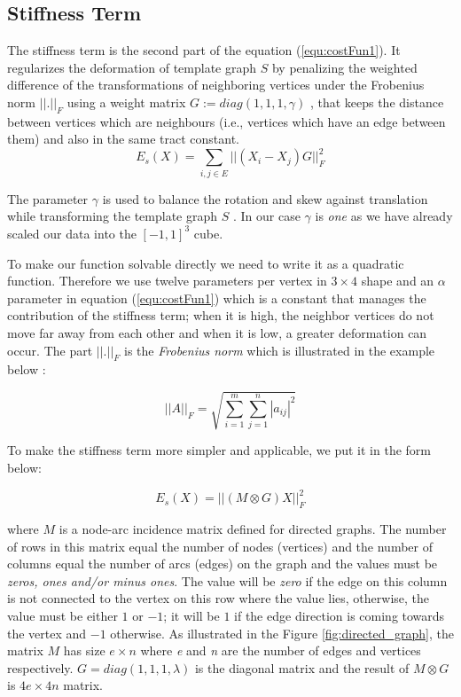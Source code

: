 \documentclass[../structure.tex]{subfiles}
\begin{document}
\subsection{Stiffness Term}
\hspace{2em}The stiffness term is the second part of the equation (\ref{equ:costFun1}). It regularizes the deformation of template graph $S$ by penalizing the weighted difference of the transformations of neighboring vertices under the Frobenius norm $||.||_{F}$ using a weight matrix $G := diag(1, 1, 1, \gamma)$ \cite{Amberg2007}, that keeps the distance between vertices which are neighbours (i.e., vertices which have an edge between them) and also in the same tract constant.
\begin{equation}
E_{s}(X) = \sum_{i,j \in E} ||(X_{i} - X_{j})G||_{F}^2
\label{equ:stiffness1}
\end{equation}

The parameter $\gamma$ is used to balance the rotation and skew against translation while transforming the template graph $S$ \cite{Amberg2007}. In our case $\gamma$ is \textit{one} as we have already scaled our data into the $[-1, 1]^3$ cube.

To make our function solvable directly we need to write it as a quadratic function. Therefore we use twelve parameters per vertex in $3 \times 4$ shape and an $\alpha$ parameter in equation (\ref{equ:costFun1}) which is a constant that manages the contribution of the stiffness term; when it is high, the neighbor vertices do not move far away from each other and when it is low, a greater deformation can occur.
The part $||.||_{F}$ is the \textit{Frobenius norm} which is illustrated in the example below \cite{Amberg2007}:

\begin{equation*}
||A||_{F} = \sqrt{\sum_{i=1}^m \sum_{j=1}^n |a_{ij}|^2}
\end{equation*}

To make the stiffness term more simpler and applicable, we put it in the form below:

\begin{equation}
E_{s}(X) = ||(M\otimes G)X||_{F}^2
\end{equation}

where $M$ is a node-arc incidence matrix defined for directed graphs. The number of rows in this matrix equal the number of nodes (vertices) and the number of columns equal the number of arcs (edges) on the graph and the values must be \textit{zeros, ones and/or minus ones}. The value will be \textit{zero} if the edge on this column is not connected to the vertex on this row where the value lies, otherwise, the value must be either $1$ or $-1$; it will be $1$ if the edge direction is coming towards the vertex and $-1$ otherwise. As illustrated in the Figure \ref{fig:directed_graph}, the matrix $M$ has size $e\times n$ where \textit{e} and \textit{n} are the number of edges and vertices respectively. $G = diag(1,1,1,\lambda)$ is the diagonal matrix and the result of $M \otimes G$ is $4e \times 4n$ matrix.
\end{document}

